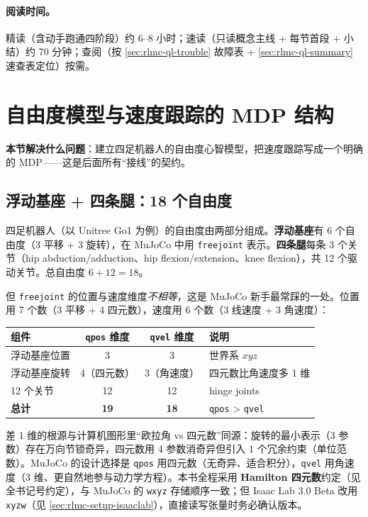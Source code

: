 \paragraph{阅读时间。}精读（含动手跑通四阶段）约 6--8 小时；速读（只读概念主线 + 每节首段 + 小结）约 70 分钟；查阅（按 \cref{sec:rlmc-ql-trouble} 故障表 + \cref{sec:rlmc-ql-summary} 速查表定位）按需。

\section{自由度模型与速度跟踪的 MDP 结构}
\label{sec:rlmc-ql-mdp}

\textbf{本节解决什么问题}：建立四足机器人的自由度心智模型，把速度跟踪写成一个明确的 MDP——这是后面所有“接线”的契约。

\subsection{浮动基座 + 四条腿：18 个自由度}
\label{sec:rlmc-ql-dof}

四足机器人（以 Unitree Go1 为例）的自由度由两部分组成。\textbf{浮动基座}有 6 个自由度（3 平移 + 3 旋转），在 MuJoCo 中用 \verb|freejoint| 表示。\textbf{四条腿}每条 3 个关节（hip abduction/adduction、hip flexion/extension、knee flexion），共 12 个驱动关节。总自由度 $6 + 12 = 18$。

但 \verb|freejoint| 的位置与速度维度\emph{不相等}，这是 MuJoCo 新手最常踩的一处。位置用 7 个数（3 平移 + 4 四元数），速度用 6 个数（3 线速度 + 3 角速度）：

\begin{center}
\small
\begin{tabular}{@{}lccl@{}}
\toprule
组件 & \texttt{qpos} 维度 & \texttt{qvel} 维度 & 说明 \\
\midrule
浮动基座位置 & 3 & 3 & 世界系 $xyz$ \\
浮动基座旋转 & 4（四元数） & 3（角速度） & 四元数比角速度多 1 维 \\
12 个关节 & 12 & 12 & hinge joints \\
\midrule
\textbf{总计} & \textbf{19} & \textbf{18} & \texttt{qpos} > \texttt{qvel} \\
\bottomrule
\end{tabular}
\end{center}

差 1 维的根源与计算机图形里“欧拉角 vs 四元数”同源：旋转的最小表示（3 参数）存在万向节锁奇异，四元数用 4 参数消奇异但引入 1 个冗余约束（单位范数）。MuJoCo 的设计选择是 \verb|qpos| 用四元数（无奇异、适合积分），\verb|qvel| 用角速度（3 维、更自然地参与动力学方程）。本书全程采用 \textbf{Hamilton 四元数}约定（见全书记号约定），与 MuJoCo 的 \verb|wxyz| 存储顺序一致；但 Isaac Lab 3.0 Beta 改用 \verb|xyzw|（见 \cref{sec:rlmc-setup-isaaclab}），直接读写张量时务必确认版本。

